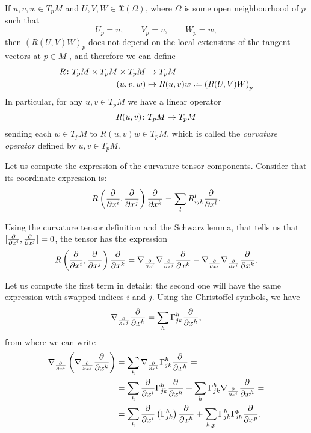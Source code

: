 \begin{remark}	
	If $u,v,w \in T_pM$ and $U,V,W \in \mathfrak{X}(\Omega)$, where $\Omega$ is some open neighbourhood of $p$ such that
	\[
		U_p = u, \qquad V_p = v, \qquad W_p = w,
	\]
	then $\left( R(U,V)W \right) _p$ does not depend on the local extensions of the tangent vectors at $p\in M$ \cite[p. 38]{oneill83}, and therefore we can define
	\begin{align*}
		R \colon T_p M \times T_p M  \times T_p M  &\to T_p M \\
		(u,v,w) &\mapsto R(u,v)w \defeq \left(R(U,V)W\right)_p
	\end{align*}
	In particular, for any $u,v \in T_p M$ we have a linear operator
	\[
	R(u,v) \colon T_p M  \to T_p M \\
	\]
	sending each $w\in T_pM$ to $R(u,v)w \in T_p M$, which is called the \emph{curvature operator} defined by $u,v\in T_p M$.
\end{remark}

Let us compute the expression of the curvature tensor components. Consider that its coordinate expression is:
\begin{equation}
\label{eq:curvaturecomponents}
R\left( \frac{\partial^{} }{\partial x^i}, \frac{\partial^{} }{\partial x^j} \right)\frac{\partial^{} }{\partial x^k} = \sum_l R^l_{ijk} \frac{\partial^{} }{\partial x^l}.
\end{equation}

Using the curvature tensor definition and the Schwarz lemma, that tells us that $[\frac{\partial^{} }{\partial x^i}, \frac{\partial^{} }{\partial x^j}] = 0$, the tensor has the expression
\[
R\left( \frac{\partial^{} }{\partial x^i}, \frac{\partial^{} }{\partial x^j} \right)\frac{\partial^{} }{\partial x^k} = \nabla_{\frac{\partial^{} }{\partial x^i}} \nabla_{\frac{\partial^{} }{\partial x^j}} \frac{\partial^{} }{\partial x^k} - \nabla_{\frac{\partial^{} }{\partial x^j}} \nabla_{\frac{\partial^{} }{\partial x^i}} \frac{\partial^{} }{\partial x^k}.
\]

Let us compute the first term in details; the second one will have the same expression with swapped indices $i$ and $j$. Using the Christoffel symbols, we have
\[
\nabla_{\frac{\partial^{} }{\partial x^j}} \frac{\partial^{} }{\partial x^k} = \sum_h \Gamma^h_{jk} \frac{\partial^{} }{\partial x^h},
\]
from where we can write
\begin{align*}
\nabla_{\frac{\partial^{} }{\partial x^i}} \left( \nabla_{\frac{\partial^{} }{\partial x^j}} \frac{\partial^{} }{\partial x^k} \right) &= \sum_h \nabla_{\frac{\partial^{} }{\partial x^i}} \Gamma^h_{jk} \frac{\partial^{} }{\partial x^h} = \\
&= \sum_h \frac{\partial^{} }{\partial x^i} \Gamma^h_{jk} \frac{\partial^{} }{\partial x^h} + \sum_h \Gamma^h_{jk} \nabla_{\frac{\partial^{} }{\partial x^i}} \frac{\partial^{} }{\partial x^h} =\\
&= \sum_h \frac{\partial^{} }{\partial x^i} \left( \Gamma^h_{jk} \right) \frac{\partial^{} }{\partial x^h} + \sum_{h,p} \Gamma^h_{jk} \Gamma^p_{ih} \frac{\partial^{} }{\partial x^p}.
\end{align*}

